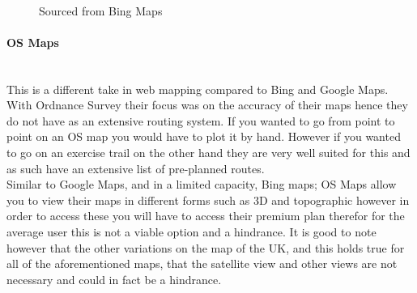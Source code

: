 \begin{flushleft}
            \bk
 
            \begin{figure}[H]
                \centering
                \caption*{Sourced from Bing Maps\textsuperscript{\tiny\textcopyright}}
            \end{figure}

            \bk

            \paragraph{OS Maps} \mbox{} \\
            This is a different take in web mapping compared to Bing and Google Maps. With Ordnance Survey their focus was on the accuracy of their maps hence they do not have as an extensive routing system.
            If you wanted to go from point to point on an OS map you would have to plot it by hand. However if you wanted to go on an exercise trail on the other hand they are very well suited
            for this and as such have an extensive list of pre-planned routes. \\
            \bk
            Similar to Google Maps, and in a limited capacity, Bing maps; OS Maps allow you to view their maps in different forms such as 3D and topographic however in order to access these you will
            have to access their premium plan therefor for the average user this is not a viable option and a hindrance. It is good to note however that the other variations on the map of the UK,
            and this holds true for all of the aforementioned maps, that the satellite view and other views are not necessary and could in fact be a hindrance. \\
            

\end{flushleft}
